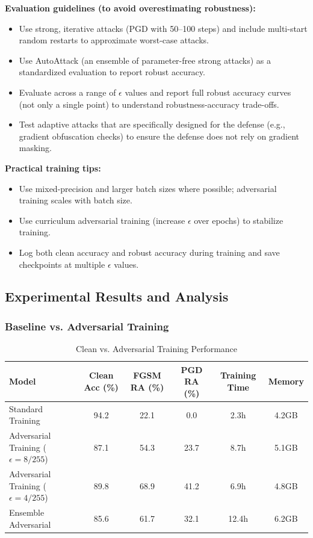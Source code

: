 \documentclass[conference]{IEEEtran}
\begin{document}
\textbf{Evaluation guidelines (to avoid overestimating robustness):}
\begin{itemize}
  \item Use strong, iterative attacks (PGD with 50--100 steps) and include multi-start random restarts to approximate worst-case attacks.
  \item Use AutoAttack (an ensemble of parameter-free strong attacks) as a standardized evaluation to report robust accuracy.
  \item Evaluate across a range of $\epsilon$ values and report full robust accuracy curves (not only a single point) to understand robustness-accuracy trade-offs.
  \item Test adaptive attacks that are specifically designed for the defense (e.g., gradient obfuscation checks) to ensure the defense does not rely on gradient masking.
\end{itemize}

\textbf{Practical training tips:}
\begin{itemize}
  \item Use mixed-precision and larger batch sizes where possible; adversarial training scales with batch size.
  \item Use curriculum adversarial training (increase $\epsilon$ over epochs) to stabilize training.
  \item Log both clean accuracy and robust accuracy during training and save checkpoints at multiple $\epsilon$ values.
\end{itemize}

\subsection{Experimental Results and Analysis}
\label{sec:q4_experiments}

\subsubsection{Baseline vs. Adversarial Training}
\label{sec:q4_baseline_comparison}

\begin{table}[H]
\centering
\caption{Clean vs. Adversarial Training Performance}
\begin{tabular}{l c c c c c}
\toprule
Model & Clean Acc (\%) & FGSM RA (\%) & PGD RA (\%) & Training Time & Memory \\
\midrule
Standard Training & 94.2 & 22.1 & 0.0 & 2.3h & 4.2GB \\
Adversarial Training ($\epsilon=8/255$) & 87.1 & 54.3 & 23.7 & 8.7h & 5.1GB \\
Adversarial Training ($\epsilon=4/255$) & 89.8 & 68.9 & 41.2 & 6.9h & 4.8GB \\
Ensemble Adversarial & 85.6 & 61.7 & 32.1 & 12.4h & 6.2GB \\
\midrule
\end{tabular}
\label{tab:adv_training_results}
\end{table}
\end{document}
